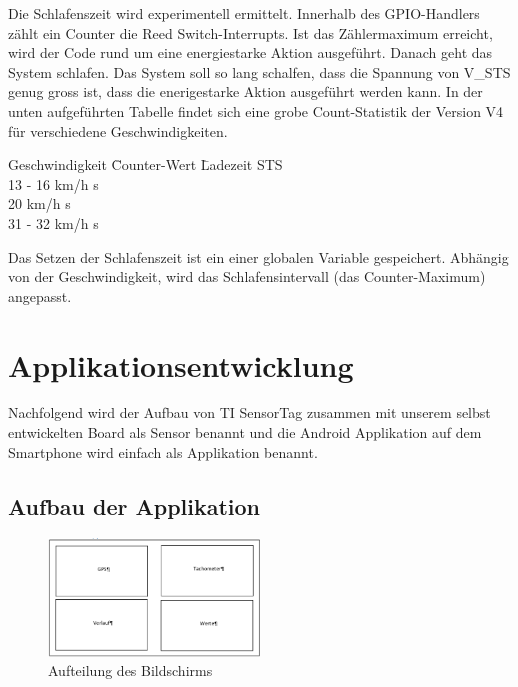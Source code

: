 Die Schlafenszeit wird experimentell ermittelt. Innerhalb des GPIO-Handlers zählt ein Counter die Reed Switch-Interrupts. Ist  das Zählermaximum erreicht, wird der Code rund um eine energiestarke Aktion ausgeführt. Danach geht das System schlafen. Das System soll so lang schalfen, dass die Spannung von V\_STS genug gross ist, dass die enerigestarke Aktion ausgeführt werden kann. In der unten aufgeführten Tabelle findet sich eine grobe Count-Statistik der Version V4 für verschiedene Geschwindigkeiten. 

\begin{minipage}{\textwidth}
    \begin{tabbing}
   Geschwindigkeit \quad\= Counter-Wert  \quad\= Ladezeit STS\\[0.8ex]
   13 - 16 km/h                          s\\
   20 km/h                                s\\
   31 - 32 km/h                           s\\    
    \end{tabbing}
\end{minipage}

Das Setzen der Schlafenszeit ist ein einer globalen Variable gespeichert. Abhängig von der Geschwindigkeit, wird das Schlafensintervall (das Counter-Maximum) angepasst.






\section{Applikationsentwicklung}
Nachfolgend wird der Aufbau von TI SensorTag zusammen mit unserem selbst entwickelten Board als Sensor benannt und die Android Applikation auf dem Smartphone wird einfach als Applikation benannt.

\subsection{Aufbau der Applikation}

\begin{figure}[ht]
    \includegraphics[width=0.5\textwidth]{3Vorgehen/imag/Aufbau_Applikation_erste_Version.png}
    \caption{Aufteilung des Bildschirms}\label{aufbau_applikation_1} 
\end{figure}

